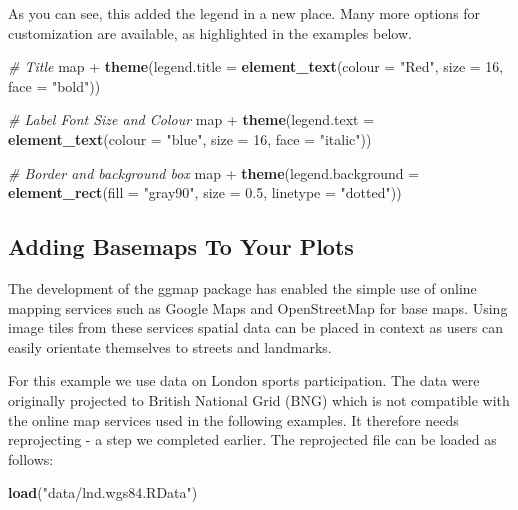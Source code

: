 \documentclass[]{article}
\newenvironment{Shaded}{}{}
\newcommand{\KeywordTok}[1]{\textcolor[rgb]{0.00,0.44,0.13}{\textbf{{#1}}}}
\newcommand{\DataTypeTok}[1]{\textcolor[rgb]{0.56,0.13,0.00}{{#1}}}
\newcommand{\DecValTok}[1]{\textcolor[rgb]{0.25,0.63,0.44}{{#1}}}
\newcommand{\FloatTok}[1]{\textcolor[rgb]{0.25,0.63,0.44}{{#1}}}
\newcommand{\StringTok}[1]{\textcolor[rgb]{0.25,0.44,0.63}{{#1}}}
\newcommand{\CommentTok}[1]{\textcolor[rgb]{0.38,0.63,0.69}{\textit{{#1}}}}
\newcommand{\NormalTok}[1]{{#1}}
\begin{document}
As you can see, this added the legend in a new place. Many more options
for customization are available, as highlighted in the examples below.

\begin{Shaded}
\begin{Highlighting}[]
\CommentTok{# Title}
\NormalTok{map +}\StringTok{ }\KeywordTok{theme}\NormalTok{(}\DataTypeTok{legend.title =} \KeywordTok{element_text}\NormalTok{(}\DataTypeTok{colour =} \StringTok{"Red"}\NormalTok{, }\DataTypeTok{size =} \DecValTok{16}\NormalTok{, }\DataTypeTok{face =} \StringTok{"bold"}\NormalTok{))}

\CommentTok{# Label Font Size and Colour}
\NormalTok{map +}\StringTok{ }\KeywordTok{theme}\NormalTok{(}\DataTypeTok{legend.text =} \KeywordTok{element_text}\NormalTok{(}\DataTypeTok{colour =} \StringTok{"blue"}\NormalTok{, }\DataTypeTok{size =} \DecValTok{16}\NormalTok{, }\DataTypeTok{face =} \StringTok{"italic"}\NormalTok{))}

\CommentTok{# Border and background box}
\NormalTok{map +}\StringTok{ }\KeywordTok{theme}\NormalTok{(}\DataTypeTok{legend.background =} \KeywordTok{element_rect}\NormalTok{(}\DataTypeTok{fill =} \StringTok{"gray90"}\NormalTok{, }\DataTypeTok{size =} \FloatTok{0.5}\NormalTok{, }\DataTypeTok{linetype =} \StringTok{"dotted"}\NormalTok{))}
\end{Highlighting}
\end{Shaded}

\subsection{Adding Basemaps To Your
Plots}\label{adding-basemaps-to-your-plots}

The development of the ggmap package has enabled the simple use of
online mapping services such as Google Maps and OpenStreetMap for base
maps. Using image tiles from these services spatial data can be placed
in context as users can easily orientate themselves to streets and
landmarks.

For this example we use data on London sports participation. The data
were originally projected to British National Grid (BNG) which is not
compatible with the online map services used in the following examples.
It therefore needs reprojecting - a step we completed earlier. The
reprojected file can be loaded as follows:

\begin{Shaded}
\begin{Highlighting}[]
\KeywordTok{load}\NormalTok{(}\StringTok{"data/lnd.wgs84.RData"}\NormalTok{)}
\end{Highlighting}
\end{Shaded}
\end{document}
